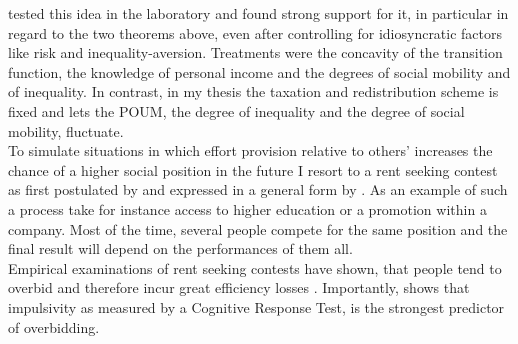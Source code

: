 \cite{checchi2003} tested this idea in the laboratory and found strong support for it, in particular in regard to the two theorems above, even after controlling for idiosyncratic factors like risk and inequality-aversion. Treatments were the concavity of the transition function, the knowledge of personal income and the degrees of social mobility and of inequality. In contrast, in my thesis the taxation and redistribution scheme is fixed and lets the POUM, the degree of inequality and the degree of social mobility, fluctuate.\\

To simulate situations in which effort provision relative to others' increases the chance of a higher social position in the future I resort to a rent seeking contest as first postulated by \cite{tullock1980} and expressed in a general form by \cite{sheremeta2010a}. As an example of such a process take for instance access to higher education or a promotion within a company. Most of the time, several people compete for the same position and the final result will depend on the performances of them all.\\
Empirical examinations of rent seeking contests have shown, that people tend to overbid and therefore incur great efficiency losses \citep{sheremeta2016, chowdhury2014, konrad2009, dechenaux2015}. Importantly, \cite{sheremeta2016} shows that impulsivity as measured by a Cognitive Response Test, is the strongest predictor of overbidding.\\